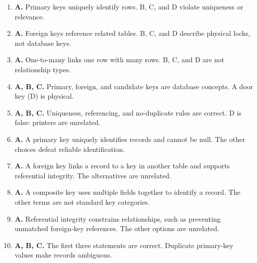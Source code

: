 \begin{enumerate}[label=\textbf{Q\arabic*.}, leftmargin=*]
\item \textbf{A.} Primary keys uniquely identify rows. B, C, and D violate uniqueness or relevance.
\item \textbf{A.} Foreign keys reference related tables. B, C, and D describe physical locks, not database keys.
\item \textbf{A.} One-to-many links one row with many rows. B, C, and D are not relationship types.
\item \textbf{A, B, C.} Primary, foreign, and candidate keys are database concepts. A door key (D) is physical.
\item \textbf{A, B, C.} Uniqueness, referencing, and no-duplicate rules are correct. D is false: printers are unrelated.
\item \textbf{A.} A primary key uniquely identifies records and cannot be null. The other choices defeat reliable identification.

\item \textbf{A.} A foreign key links a record to a key in another table and supports referential integrity. The alternatives are unrelated.

\item \textbf{A.} A composite key uses multiple fields together to identify a record. The other terms are not standard key categories.

\item \textbf{A.} Referential integrity constrains relationships, such as preventing unmatched foreign-key references. The other options are unrelated.

\item \textbf{A, B, C.} The first three statements are correct. Duplicate primary-key values make records ambiguous.

\end{enumerate}
